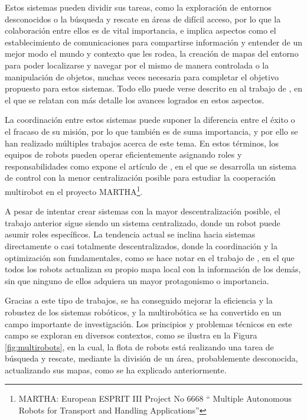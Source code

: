 Estos sistemas pueden dividir sus tareas, como la exploración de entornos
desconocidos o la búsqueda y rescate en áreas de difícil acceso, por lo que la
colaboración entre ellos es de vital importancia, e implica aspectos como el
establecimiento de comunicaciones para compartirse información y entender de un
mejor modo el mundo y contexto que les rodea, la creación de mapas del entorno
para poder localizarse y navegar por el mismo de manera controlada o la
manipulación de objetos, muchas veces necesaria para completar el objetivo
propuesto para estos sistemas.
Todo ello puede verse descrito en al trabajo de \cite{Parker2003}, en el que se
relatan con más detalle los avances logrados en estos aspectos.

La coordinación entre estos sistemas puede suponer la diferencia entre el éxito
o el fracaso de su misión, por lo que también es de suma importancia, y por ello
se han realizado múltiples trabajos acerca de este tema.
En estos términos, los equipos de robots pueden operar eficientemente
asignando roles y responsabilidades como expone el artículo de \cite{Alami1998},
en el que se desarrolla un sistema de control con la menor centralización
posible para estudiar la cooperación multirobot en el proyecto
MARTHA\footnote{MARTHA: European ESPRIT III Project No 6668 \textquotedblleft
Multiple Autonomous Robots for Transport and Handling
Applications\textquotedblright}.

A pesar de intentar crear sistemas con la mayor descentralización posible, el
trabajo anterior sigue siendo un sistema centralizado, donde un robot puede
asumir roles específicos.
La tendencia actual se inclina hacia sistemas directamente o casi totalmente
descentralizados, donde la coordinación y la optimización son fundamentales,
como se hace notar en el trabajo de \cite{Sheng2006}, en el que todos los robots
actualizan su propio mapa local con la información de los demás, sin que ninguno
de ellos adquiera un mayor protagonismo o importancia.

Gracias a este tipo de trabajos, se ha conseguido mejorar la eficiencia y la
robustez de los sistemas robóticos, y la multirobótica se ha convertido en un
campo importante de investigación.
Los principios y problemas técnicos en este campo se exploran en diversos
contextos, como se ilustra en la Figura \ref{fig:multirobots}, en la cual, la
flota de robots está realizando una tarea de búsqueda y rescate, mediante la
división de un área, probablemente desconocida, actualizando sus mapas, como
se ha explicado anteriormente.

